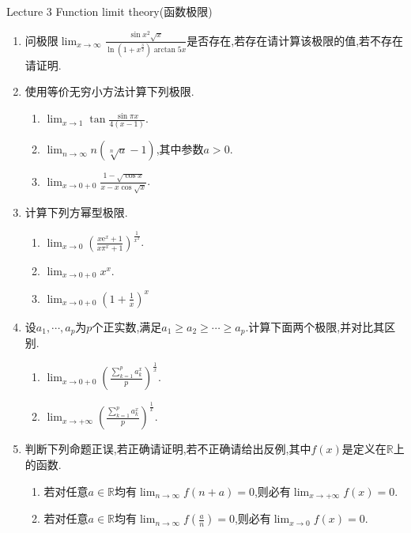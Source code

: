 \documentclass[b5paper,oneside]{ctexart}
\date{\today}
\begin{document}
\pagestyle{empty}
\begin{center}\Large Lecture 3 Function limit theory(函数极限)\end{center}
\begin{enumerate}[1.]
    \item 问极限$\lim_{x \to \infty} \frac{\sin{x^2}\sqrt{x}}{\ln{(1+x^\frac{3}{2})}\arctan{5x}}$是否存在,若存在请计算该极限的值,若不存在请证明.
    \newpage
    \item 使用等价无穷小方法计算下列极限.
        \begin{enumerate}[(1)]
            \item $\lim_{x \to 1} \tan{\frac{\sin{\pi x}}{4(x-1)}}$.
            \item $\lim_{n \to \infty} n(\sqrt[n]{a}-1)$,其中参数$a>0$.
            \item $\lim_{x \to 0+0} \frac{1-\sqrt{\cos{x}}}{x-x\cos{\sqrt{x}}}$.
        \end{enumerate}
    \newpage
    \item 计算下列方幂型极限.
        \begin{enumerate}[(1)]
            \item $\lim_{x \to 0} (\frac{x\mathrm{e}^x+1}{x\pi^x+1})^{\frac{1}{x^2}}$.
            \item $\lim_{x \to 0+0} x^x$.
            \item $\lim_{x \to 0+0} (1+\frac{1}{x})^x$
        \end{enumerate}
    \newpage
    \item 设$a_1,\cdots,a_p$为$p$个正实数,满足$a_1\geqslant a_2\geqslant\cdots\geqslant a_p$.计算下面两个极限,并对比其区别.
        \begin{enumerate}[(1)]
            \item $\lim_{x \to 0+0} (\frac{\sum_{k=1}^{p} a_k^x}{p})^{\frac{1}{x}}$.
            \item $\lim_{x \to +\infty} (\frac{\sum_{k=1}^{p} a_k^x}{p})^{\frac{1}{x}}$.
        \end{enumerate}
    \newpage
    \item 判断下列命题正误,若正确请证明,若不正确请给出反例,其中$f(x)$是定义在$\mathbb{R}$上的函数.
        \begin{enumerate}[(1)]
            \item 若对任意$a \in \mathbb{R}$均有$\lim_{n \to \infty} f(n+a)=0$,则必有$\lim_{x \to +\infty}{f(x)}=0$.
            \item 若对任意$a \in \mathbb{R}$均有$\lim_{n \to \infty} f(\frac{a}{n})=0$,则必有$\lim_{x \to 0}{f(x)}=0$.

\end{enumerate}
\end{enumerate}
\end{document}

